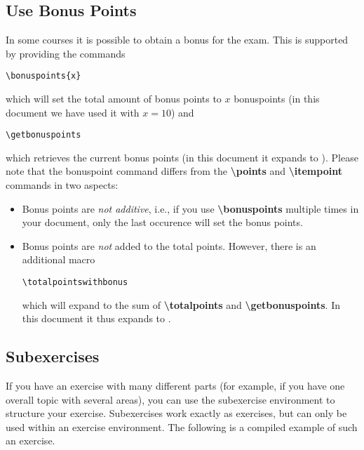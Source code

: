\documentclass[
  twocolumn,%
  fontsize=9pt,%
  DIV=calc,%
  numbers=noendperiod%
]{scrartcl}
\begin{document}
\subsection{Use Bonus Points}
In some courses it is possible to obtain a bonus for the exam. This is supported by providing the commands
\begin{lstlisting}
\bonuspoints{x}
\end{lstlisting}
which will set the total amount of bonus points to $x$ bonuspoints (in this document we have used it with $x=10$) and
\begin{lstlisting}
\getbonuspoints
\end{lstlisting}
which retrieves the current bonus points (in this document it expands to \getbonuspoints). Please note that the {bonuspoint} command differs from the \textcolor{NavyBlue}{\ttfamily\bfseries\textbackslash points} and \textcolor{NavyBlue}{\ttfamily\bfseries\textbackslash itempoint} commands in two aspects:
\begin{itemize} 
\item Bonus points are \emph{not additive}, i.e., if you use \textcolor{NavyBlue}{\ttfamily\bfseries\textbackslash bonuspoints} multiple times in your document, only the last occurence will set the bonus points.
\item Bonus points are \emph{not} added to the total points. However, there is an additional macro 
\begin{lstlisting}
\totalpointswithbonus
\end{lstlisting}
which will expand to the sum of \textcolor{NavyBlue}{\ttfamily\bfseries\textbackslash totalpoints} and \textcolor{NavyBlue}{\ttfamily\bfseries\textbackslash getbonuspoints}. In this document it thus expands to \totalpointswithbonus.
\end{itemize}

\subsection{Subexercises}
If you have an exercise with many different parts (for example, if you have one overall topic with several areas), you can use the subexercise environment to structure your exercise. Subexercises work exactly as exercises, but can only be used within an exercise environment. The following is a compiled example of such an exercise.
\end{document}
